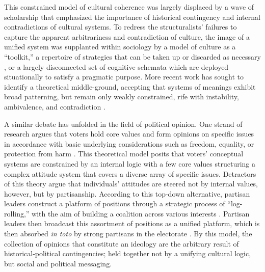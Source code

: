 \documentclass{article}
\begin{document}
This constrained model of cultural coherence was largely displaced by a
wave of scholarship that emphasized the importance of historical
contingency and internal contradictions of cultural systems. To redress
the structuralists' failures to capture the apparent arbitrariness and
contradiction of culture, the image of a unified system was supplanted
within sociology by a model of culture as a ``toolkit,'' a repertoire of
strategies that can be taken up or discarded as necessary
\parencite{Swidler2003-il}, or a largely
disconnected set of cognitive schemata which are deployed situationally
\parencite{DiMaggio1997-rx} to satisfy a
pragmatic purpose. More recent work has sought to identify a theoretical
middle-ground, accepting that systems of meanings exhibit broad
patterning, but remain only weakly constrained, rife with instability,
ambivalence, and contradiction
\parencite{Baldassarri2014-mi, Boutyline2017-vj, Kiley2020-hi, Rawlings2020-yb, Swidler2003-il}.

A similar debate has unfolded in the field of political opinion. One
strand of research argues that voters hold core values and form opinions
on specific issues in accordance with basic underlying considerations
such as freedom, equality, or protection from harm
\parencite{Feldman1992-lf, Goren2016-rw, Haidt2012-fy, Lakoff2010-yy}. This
theoretical model posits that voters' conceptual systems are constrained
by an internal logic with a few core values structuring a complex
attitude system that covers a diverse array of specific issues.
Detractors of this theory argue that individuals' attitudes are steered
not by internal values, however, but by partisanship. According to this
top-down alternative, partisan leaders construct a platform of positions
through a strategic process of ``log-rolling,'' with the aim of building
a coalition across various interests
\parencite{Carmines1989-yi, Zaller1992-eq}. Partisan leaders then broadcast this assortment of
positions as a unified platform, which is then absorbed \emph{in toto}
by strong partisans in the electorate
\parencite{Green2004-eq}. By this model, the collection of opinions that
constitute an ideology are the arbitrary result of historical-political
contingencies; held together not by a unifying cultural logic, but
social and political messaging.
\end{document}
